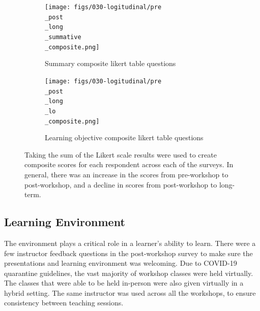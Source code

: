 \documentclass[030-workshop.tex]{subfiles}
\begin{document}
            \begin{figure}[!hbtp]
                \centering
                \begin{subfigure}[h]{0.45\textwidth}
                    \centering
                    \texttt{[image: figs/030-logitudinal/pre\\\_post\\\_long\\\_summative\\\_composite.png]}
                    \caption[Pre-Post-workshop and Long-term Survey for summary likert composite]
                    {Summary composite likert table questions}
                    \label{sfig:pre-post-long-composite-summary}
                \end{subfigure}
                \hfill
                \begin{subfigure}[h]{0.45\textwidth}
                    \centering
                    \texttt{[image: figs/030-logitudinal/pre\\\_post\\\_long\\\_lo\\\_composite.png]}
                    \caption[Pre-Post-workshop and Long-term Survey for learning objective likert composite]
                    {Learning objective composite likert table questions}
                    \label{sfig:pre-post-long-composite-lo}
                \end{subfigure}
                \caption[Summary table and learning objective composite likert questions (pre, post, long-term)]
                {Taking the sum of the Likert scale results were used to create composite scores for each respondent
                 across each of the surveys.
                 In general, there was an increase in the scores from pre-workshop to post-workshop,
                 and a decline in scores from post-workshop to long-term.
                }
                \label{fig:pre-post-long-composite-summary-lo}
            \end{figure}

    \subsection{Learning Environment}

        The environment plays a critical role in a learner's ability to learn.
        There were a few instructor feedback questions in the post-workshop survey to make sure
        the presentations and learning environment was welcoming.
        Due to COVID-19 quarantine guidelines,
        the vast majority of workshop classes were held virtually.
        The classes that were able to be held in-person were also given virtually in a hybrid setting.
        The same instructor was used across all the workshops, to ensure consistency between teaching sessions.
\end{document}
